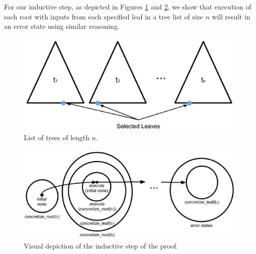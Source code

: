 For our inductive step, as depicted in Figures  \ref{fig:tlist} and \ref{fig:indstep}, we show that execution of each root with inputs from each specified leaf in a tree list of size $n$ will result in an error state using similar reasoning.

\begin{figure}
\includegraphics[width=\textwidth]{tlist.eps}
\caption{List of trees of length $n$.}
\label{fig:tlist}
\end{figure}

\begin{figure}
\includegraphics[width=\textwidth]{set4.eps}
\caption{Visual depiction of the inductive step of the proof.}
\label{fig:indstep}
\end{figure}
